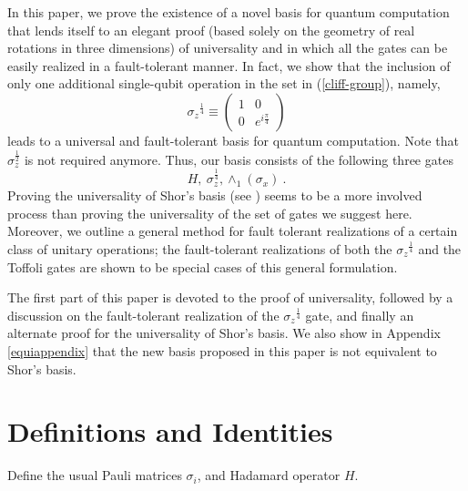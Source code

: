 \documentclass[twocolumn,11pt]{article}
\begin{document}

In this paper, we prove the existence of a novel basis
for quantum computation that lends itself to an elegant proof 
(based solely on the geometry of real rotations in three dimensions) of universality 
and in which all the gates can be easily realized in a fault-tolerant manner. 
In fact, we show that the inclusion of only one additional
single-qubit operation in the set in (\ref{cliff-group}), namely,
\[ {\sigma_z}^{\frac{1}{4}} \equiv  \left( \begin{array}{cc} 1 & 0 \\ 0 &
e^{i\frac{\pi}{4}} \end{array} \right) \]  
leads to a universal and fault-tolerant basis for quantum computation. 
Note that $ \sigma_z^\frac{1}{2}$ is not required anymore.
Thus, our basis consists of the following three gates
\begin{equation}
H, \ \sigma_z^\frac{1}{4}, \wedge_1(\sigma_x)\ . \label{our-basis}
\end{equation}
Proving the universality of Shor's basis (see \cite{kitaevQC}) seems to be a more 
involved process than proving the universality of the set of gates we suggest 
here. Moreover, we outline a general method for fault tolerant realizations of a 
certain class of unitary operations; the fault-tolerant realizations of both the
${\sigma_z}^{\frac{1}{4}}$ and the Toffoli gates are shown to be special cases of this
general formulation.

The first part of this paper is devoted to the proof of universality,
followed by a discussion on the fault-tolerant realization of the
${\sigma_z}^{\frac{1}{4}}$ gate, and finally an alternate proof for the
universality of Shor's basis. We also show in Appendix \ref{equiappendix} 
that the new basis proposed in this paper is not equivalent to Shor's basis.

\section{Definitions and Identities}
Define the usual Pauli matrices $\sigma_i$, and Hadamard operator $H$.\\
\end{document}
